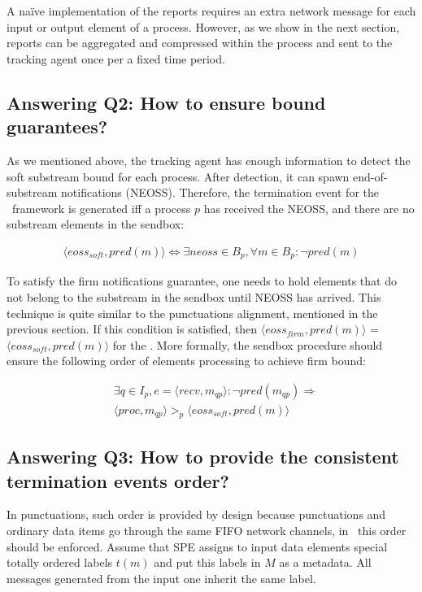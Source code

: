 A na\"ive implementation of the reports requires an extra network message for each input or output element of a process. However, as we show in the next section, reports can be aggregated and compressed within the process and sent to the tracking agent once per a fixed time period.

\subsection{Answering Q2: How to ensure bound guarantees?}

As we mentioned above, the tracking agent has enough information to detect the soft substream bound for each process. After detection, it can spawn end-of-substream notifications (NEOSS). Therefore, the termination event for the \tracker\ framework is generated iff a process $p$ has received the NEOSS, and there are no substream elements in the sendbox:

\begin{align*}
\langle eoss_{soft}, pred(m)\rangle \Longleftrightarrow \exists neoss \in B_p, \forall m\in B_p : \neg pred(m)
\end{align*}

To satisfy the firm notifications guarantee, one needs to hold elements that do not belong to the substream in the sendbox until NEOSS has arrived. This technique is quite similar to the punctuations alignment, mentioned in the previous section. If this condition is satisfied, then $\langle eoss_{firm}, pred(m)\rangle$ = $\langle eoss_{soft}, pred(m)\rangle$ for the \tracker. More formally, the sendbox procedure should ensure the following order of elements processing to achieve firm bound:

\begin{align*}
& \exists q \in I_p, e = \langle recv,m_{qp} \rangle : \neg pred(m_{qp}) \Longrightarrow \\ 
& \langle proc, m_{qp}\rangle >_p \langle eoss_{soft}, pred(m)\rangle
\end{align*} 

\subsection{Answering Q3: How to provide the consistent termination events order?}
In punctuations, such order is provided by design because punctuations and ordinary data items go through the same FIFO network channels, in \tracker\, this order should be enforced. Assume that SPE assigns to input data elements special totally ordered labels $t(m)$ and put this labels in $M$ as a metadata. All messages generated from the input one inherit the same label. 

